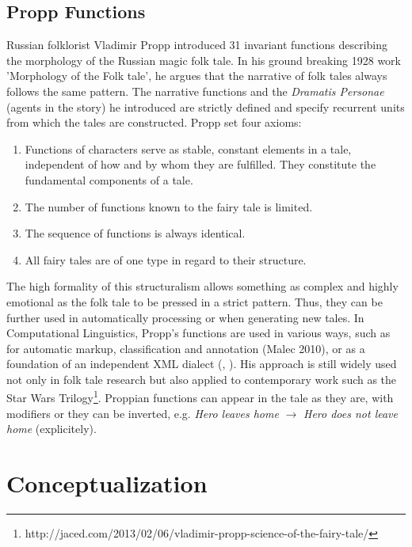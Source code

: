 \documentclass[10pt,a4paper]{article}
\begin{document}
	\subsection{Propp Functions} 
	Russian folklorist Vladimir Propp introduced 31 invariant functions describing the morphology of the Russian magic folk tale. In his ground breaking 1928 work 'Morphology of the Folk tale', he argues that the narrative of folk tales always follows the same pattern. The narrative functions and the \textit{Dramatis Personae} (agents in the story) he introduced are strictly defined and specify recurrent units from which the tales are constructed. 
	Propp \cite{propp1968} set four axioms: 
	
	\begin{enumerate}
	
		\item Functions of characters serve as stable, constant elements in a tale, independent of how and by whom they are fulfilled. They constitute the fundamental components of a tale.
		\item The number of functions known to the fairy tale is limited.
		\item The sequence of functions is always identical.
		\item All fairy tales are of one type in regard to their structure.   
	
	\end{enumerate}
	
The high formality of this structuralism allows something as complex and highly emotional as the folk tale to be pressed in a strict pattern. Thus, they can be further used in automatically processing or when generating new tales. In Computational Linguistics, Propp's functions are used in various ways, such as for automatic markup, classification and annotation (Malec 2010), or as a foundation of an independent XML dialect (\cite{Malec2010}, \cite{Lendvai2010}). 
	His approach is still widely used not only in folk tale research but also applied to contemporary work such as the Star Wars Trilogy\footnote{http://jaced.com/2013/02/06/vladimir-propp-science-of-the-fairy-tale/}.  Proppian functions can appear in the tale as they are, with modifiers or they can be inverted, e.g. \textit{Hero leaves home} $\rightarrow$ \textit{Hero does not leave home} (explicitely).

\section{Conceptualization}
\end{document}
